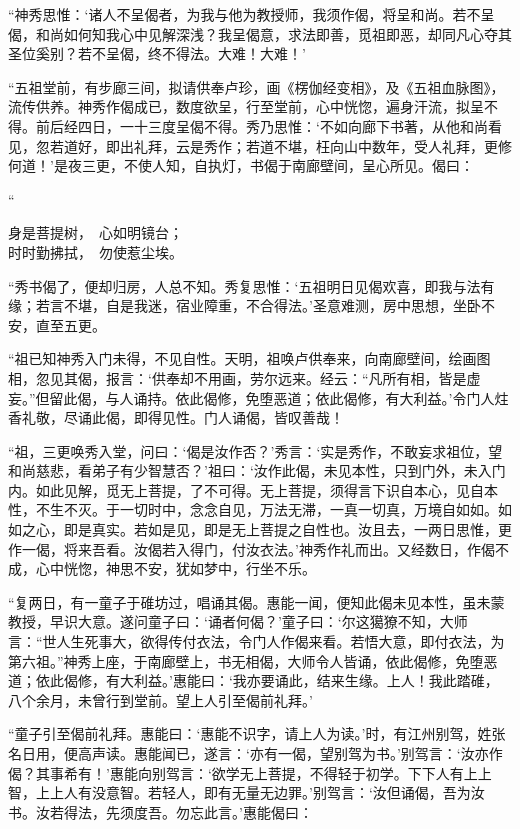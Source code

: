 \documentclass[UTF8, 11pt, oneside]{ctexart}
\newenvironment{jizi}[1]{
    \vspace{-1em}\begin{center}
        #1%
        \begin{varwidth}[t]{\linewidth}
}{
        \end{varwidth}
    \end{center}
}
\begin{document}
“神秀思惟：‘诸人不呈偈者，为我与他为教授师，我须作偈，将呈和尚。若不呈偈，和尚如何知我心中见解深浅？我呈偈意，求法即善，觅祖即恶，却同凡心夺其圣位奚别？若不呈偈，终不得法。大难！大难！’

“五祖堂前，有步廊三间，拟请供奉卢珍，画《楞伽经变相》，及《五祖血脉图》，流传供养。神秀作偈成已，数度欲呈，行至堂前，心中恍惚，遍身汗流，拟呈不得。前后经四日，一十三度呈偈不得。秀乃思惟：‘不如向廊下书著，从他和尚看见，忽若道好，即出礼拜，云是秀作；若道不堪，枉向山中数年，受人礼拜，更修何道！’是夜三更，不使人知，自执灯，书偈于南廊壁间，呈心所见。偈曰：

\begin{jizi}{“}
    身是菩提树，　心如明镜台； \\
    时时勤拂拭，　勿使惹尘埃。
\end{jizi}

“秀书偈了，便却归房，人总不知。秀复思惟：‘五祖明日见偈欢喜，即我与法有缘；若言不堪，自是我迷，宿业障重，不合得法。’圣意难测，房中思想，坐卧不安，直至五更。

“祖已知神秀入门未得，不见自性。天明，祖唤卢供奉来，向南廊壁间，绘画图相，忽见其偈，报言：‘供奉却不用画，劳尔远来。经云：“凡所有相，皆是虚妄。”但留此偈，与人诵持。依此偈修，免堕恶道；依此偈修，有大利益。’令门人炷香礼敬，尽诵此偈，即得见性。门人诵偈，皆叹善哉！

“祖，三更唤秀入堂，问曰：‘偈是汝作否？’秀言：‘实是秀作，不敢妄求祖位，望和尚慈悲，看弟子有少智慧否？’祖曰：‘汝作此偈，未见本性，只到门外，未入门内。如此见解，觅无上菩提，了不可得。无上菩提，须得言下识自本心，见自本性，不生不灭。于一切时中，念念自见，万法无滞，一真一切真，万境自如如。如如之心，即是真实。若如是见，即是无上菩提之自性也。汝且去，一两日思惟，更作一偈，将来吾看。汝偈若入得门，付汝衣法。’神秀作礼而出。又经数日，作偈不成，心中恍惚，神思不安，犹如梦中，行坐不乐。

“复两日，有一童子于碓坊过，唱诵其偈。惠能一闻，便知此偈未见本性，虽未蒙教授，早识大意。遂问童子曰：‘诵者何偈？’童子曰：‘尔这獦獠不知，大师言：“世人生死事大，欲得传付衣法，令门人作偈来看。若悟大意，即付衣法，为第六祖。”神秀上座，于南廊壁上，书无相偈，大师令人皆诵，依此偈修，免堕恶道；依此偈修，有大利益。’惠能曰：‘我亦要诵此，结来生缘。上人！我此踏碓，八个余月，未曾行到堂前。望上人引至偈前礼拜。’

“童子引至偈前礼拜。惠能曰：‘惠能不识字，请上人为读。’时，有江州别驾，姓张名日用，便高声读。惠能闻已，遂言：‘亦有一偈，望别驾为书。’别驾言：‘汝亦作偈？其事希有！’惠能向别驾言：‘欲学无上菩提，不得轻于初学。下下人有上上智，上上人有没意智。若轻人，即有无量无边罪。’别驾言：‘汝但诵偈，吾为汝书。汝若得法，先须度吾。勿忘此言。’惠能偈曰：
\end{document}
